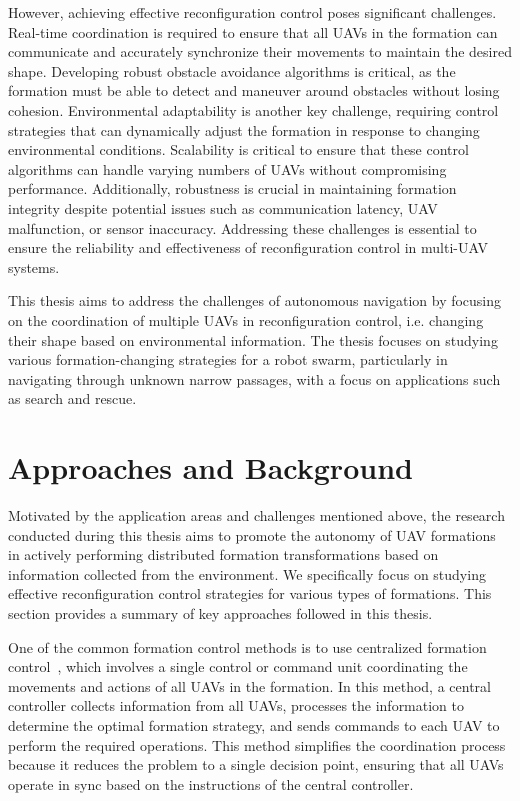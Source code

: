 However, achieving effective reconfiguration control poses significant challenges. Real-time coordination is required to ensure that all UAVs in the formation can communicate and accurately synchronize their movements to maintain the desired shape. Developing robust obstacle avoidance algorithms is critical, as the formation must be able to detect and maneuver around obstacles without losing cohesion. Environmental adaptability is another key challenge, requiring control strategies that can dynamically adjust the formation in response to changing environmental conditions. Scalability is critical to ensure that these control algorithms can handle varying numbers of UAVs without compromising performance. Additionally, robustness is crucial in maintaining formation integrity despite potential issues such as communication latency, UAV malfunction, or sensor inaccuracy. Addressing these challenges is essential to ensure the reliability and effectiveness of reconfiguration control in multi-UAV systems.

This thesis aims to address the challenges of autonomous navigation by focusing on the coordination of multiple UAVs in reconfiguration control, i.e. changing their shape based on environmental information. The thesis focuses on studying various formation-changing strategies for a robot swarm, particularly in navigating through unknown narrow passages, with a focus on applications such as search and rescue.

\section{Approaches and Background}
Motivated by the application areas and challenges mentioned above, the research conducted during this thesis aims to promote the autonomy of UAV formations in actively performing distributed formation transformations based on information collected from the environment. We specifically focus on studying effective reconfiguration control strategies for various types of formations. This section provides a summary of key approaches followed in this thesis.

One of the common formation control methods is to use centralized formation control~\cite{Oh2015,1545539}, which involves a single control or command unit coordinating the movements and actions of all UAVs in the formation. In this method, a central controller collects information from all UAVs, processes the information to determine the optimal formation strategy, and sends commands to each UAV to perform the required operations. This method simplifies the coordination process because it reduces the problem to a single decision point, ensuring that all UAVs operate in sync based on the instructions of the central controller.

